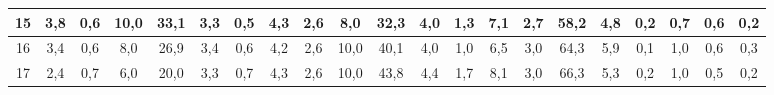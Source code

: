 \begin{sidewaystable}[]
\begin{tabular}{|c|c|c|c|c|c|c|c|c|c|c|c|c|c|c|c|c|c|c|c|c|}
    15 &  3,8                                              & 0,6                                              & 10,0                                             & 33,1                                             & 3,3                                              & 0,5                                              & 4,3                                              & 2,6                                              & 8,0                                              & 32,3                                             & 4,0                                              & 1,3                                              & 7,1                                              & 2,7                                              & 58,2                                             & 4,8                                              & 0,2                                              & 0,7                                              & 0,6                                              & 0,2                                              \\ \hline
    16 &  3,4                                              & 0,6                                              & 8,0                                              & 26,9                                             & 3,4                                              & 0,6                                              & 4,2                                              & 2,6                                              & 10,0                                             & 40,1                                             & 4,0                                              & 1,0                                              & 6,5                                              & 3,0                                              & 64,3                                             & 5,9                                              & 0,1                                              & 1,0                                              & 0,6                                              & 0,3                                              \\ \hline
    17 &  2,4                                              & 0,7                                              & 6,0                                              & 20,0                                             & 3,3                                              & 0,7                                              & 4,3                                              & 2,6                                              & 10,0                                             & 43,8                                             & 4,4                                              & 1,7                                              & 8,1                                              & 3,0                                              & 66,3                                             & 5,3                                              & 0,2                                              & 1,0                                              & 0,5                                              & 0,2                                              \\ \hline

\end{tabular}
\end{sidewaystable}
